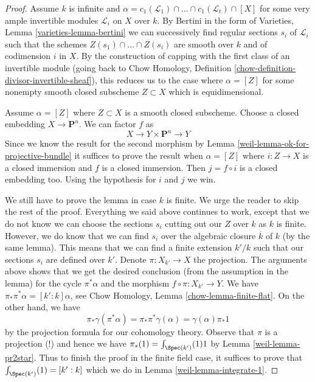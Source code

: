 \begin{proof}
\medskip\noindent
Assume $k$ is infinite and $\alpha =
c_1(\mathcal{L}_1) \cap \ldots \cap c_1(\mathcal{L}_t) \cap [X]$
for some very ample invertible modules $\mathcal{L}_i$ on $X$ over $k$.
By Bertini in the form of Varieties, Lemma \ref{varieties-lemma-bertini}
we can successively find regular sections $s_i$ of $\mathcal{L}_i$
such that the schemes $Z(s_1) \cap \ldots \cap Z(s_i)$
are smooth over $k$ and of codimension $i$ in $X$.
By the construction of capping with the first class of
an invertible module (going back to
Chow Homology, Definition \ref{chow-definition-divisor-invertible-sheaf}),
this reduces us to the case where $\alpha = [Z]$
for some nonempty smooth closed subscheme $Z \subset X$ which
is equidimensional.

\medskip\noindent
Assume $\alpha = [Z]$ where $Z \subset X$ is a smooth closed subscheme.
Choose a closed embedding $X \to \mathbf{P}^n$. We can factor $f$ as
$$
X \to Y \times \mathbf{P}^n \to Y
$$
Since we know the result for the second morphism by
Lemma \ref{weil-lemma-ok-for-projective-bundle}
it suffices to prove the result when
$\alpha = [Z]$ where $i : Z \to X$ is a closed immersion
and $f$ is a closed immersion.
Then $j = f \circ i$ is a closed embedding too.
Using the hypothesis for $i$ and $j$ we win.

\medskip\noindent
We still have to prove the lemma in case $k$ is finite. We urge the
reader to skip the rest of the proof. Everything we said above continues
to work, except that we do not know we can choose the sections
$s_i$ cutting out our $Z$ over $k$ as $k$ is finite. However, we do
know that we can find $s_i$ over the algebraic closure $\overline{k}$
of $k$ (by the same lemma). This means that we can
find a finite extension $k'/k$ such that our sections $s_i$
are defined over $k'$. Denote $\pi : X_{k'} \to X$ the projection.
The arguments above shows that we get the desired conclusion
(from the assumption in the lemma)
for the cycle $\pi^*\alpha$ and the morphism
$f \circ \pi : X_{k'} \to Y$.
We have $\pi_*\pi^*\alpha = [k' : k] \alpha$, see
Chow Homology, Lemma \ref{chow-lemma-finite-flat}.
On the other hand, we have
$$
\pi_*\gamma(\pi^*\alpha) = \pi_*\pi^*\gamma(\alpha) =
\gamma(\alpha) \pi_*1
$$
by the projection formula for our cohomology theory. Observe
that $\pi$ is a projection (!) and hence we have
$\pi_*(1) = \int_{\Spec(k')}(1) 1$ by
Lemma \ref{weil-lemma-pr2star}. Thus to finish the proof in the
finite field case, it suffices to prove that
$\int_{\Spec(k')}(1) = [k' : k]$ which we do in
Lemma \ref{weil-lemma-integrate-1}.
\end{proof}

